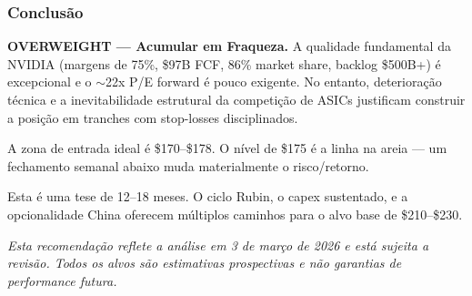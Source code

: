 \documentclass[11pt,a4paper]{article}
\begin{document}
\subsubsection{Conclus\~ao}

\textbf{OVERWEIGHT --- Acumular em Fraqueza.} A qualidade fundamental da NVIDIA (margens de 75\%, \$97B FCF, 86\% market share, backlog \$500B+) \'e excepcional e o $\sim$22x P/E forward \'e pouco exigente. No entanto, deteriora\c{c}\~ao t\'ecnica e a inevitabilidade estrutural da competi\c{c}\~ao de ASICs justificam construir a posi\c{c}\~ao em tranches com stop-losses disciplinados.

A zona de entrada ideal \'e \$170--\$178. O n\'ivel de \$175 \'e a linha na areia --- um fechamento semanal abaixo muda materialmente o risco/retorno.

Esta \'e uma tese de 12--18 meses. O ciclo Rubin, o capex sustentado, e a opcionalidade China oferecem m\'ultiplos caminhos para o alvo base de \$210--\$230.

\vspace{1cm}
\begin{center}
\small\textit{Esta recomenda\c{c}\~ao reflete a an\'alise em 3 de mar\c{c}o de 2026 e est\'a sujeita a revis\~ao. Todos os alvos s\~ao estimativas prospectivas e n\~ao garantias de performance futura.}
\end{center}
\end{document}
